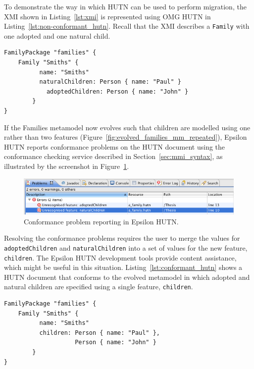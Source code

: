 To demonstrate the way in which HUTN can be used to perform migration, the XMI shown in Listing~\ref{lst:xmi} is represented using OMG HUTN in Listing~\ref{lst:non-conformant_hutn}. Recall that the XMI describes a \texttt{Fa\-mi\-ly} with one adopted and one natural child.

\begin{lstlisting}[caption=OMG HUTN for people with mothers and fathers., label=lst:non-conformant_hutn, language=HutnFamilies, float=tb]
FamilyPackage "families" {
    Family "Smiths" {
	      name: "Smiths"
	      naturalChildren: Person { name: "Paul" }
		    adoptedChildren: Person { name: "John" }
		}
}
\end{lstlisting}

If the Families metamodel now evolves such that children are modelled using one rather than two features (Figure~\ref{fig:evolved_families_mm_repeated}), Epsilon HUTN reports conformance problems on the HUTN document using the conformance checking service described in Section~\ref{sec:mmi_syntax}, as illustrated by the screenshot in Figure~\ref{fig:hutn_conformance_reporting}.

\begin{figure}[tbp]
  \begin{center}
    \leavevmode
    \includegraphics[scale=0.44]{5.Implementation/hutn_conformance_reporting.png}
  \end{center}
  \caption{Conformance problem reporting in Epsilon HUTN.}
  \label{fig:hutn_conformance_reporting}
\end{figure}

Resolving the conformance problems requires the user to merge the values for \texttt{ad\-op\-t\-edCh\-il\-dr\-en} and \texttt{na\-tu\-ralCh\-il\-dr\-en} into a set of values for the new feature, \texttt{ch\-il\-dr\-en}. The Epsilon HUTN development tools provide content assistance, which might be useful in this situation. Listing~\ref{lst:conformant_hutn} shows a HUTN document that conforms to the evolved metamodel in which adopted and natural children are specified using a single feature, \texttt{ch\-il\-dr\-en}.

\begin{lstlisting}[caption=HUTN for people with parents., label=lst:conformant_hutn, language=HutnFamilies, float=tb]
FamilyPackage "families" {
    Family "Smiths" {
	      name: "Smiths"
	      children: Person { name: "Paul" },
                    Person { name: "John" }
		}
}
\end{lstlisting}

